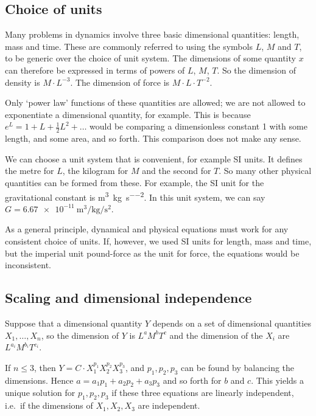 \subsection{Choice of units}
Many problems in dynamics involve three basic dimensional quantities: length, mass and time.
These are commonly referred to using the symbols \(L\), \(M\) and \(T\), to be generic over the choice of unit system.
The dimensions of some quantity \(x\) can therefore be expressed in terms of powers of \(L\), \(M\), \(T\).
So the dimension of density is \(M \cdot L^{-3}\).
The dimension of force is \(M \cdot L \cdot T^{-2}\).

Only `power law' functions of these quantities are allowed; we are not allowed to exponentiate a dimensional quantity, for example.
This is because \(e^L = 1 + L + \frac{1}{2}L^2 + \dots\) would be comparing a dimensionless constant 1 with some length, and some area, and so forth.
This comparison does not make any sense.

We can choose a unit system that is convenient, for example SI units.
It defines the metre for \(L\), the kilogram for \(M\) and the second for \(T\).
So many other physical quantities can be formed from these.
For example, the SI unit for the gravitational constant is \si{\metre\cubed\per\kilogram\per\second\squared}.
In this unit system, we can say \(G = \SI{6.67e-11}{\metre\cubed\per\kilogram\per\second\squared}\).

As a general principle, dynamical and physical equations must work for any consistent choice of units.
If, however, we used SI units for length, mass and time, but the imperial unit pound-force as the unit for force, the equations would be inconsistent.

\subsection{Scaling and dimensional independence}
Suppose that a dimensional quantity \(Y\) depends on a set of dimensional quantities \(X_1, \dots, X_n\), so the dimension of \(Y\) is \(L^a M^b T^c\) and the dimension of the \(X_i\) are \(L^{a_i} M^{b_i} T^{c_i}\).

If \(n \leq 3\), then \(Y = C \cdot X_1^{p_1}X_2^{p_2}X_3^{p_3}\), and \(p_1, p_2, p_3\) can be found by balancing the dimensions.
Hence \(a = a_1p_1 + a_2p_2 + a_3p_3\) and so forth for \(b\) and \(c\).
This yields a unique solution for \(p_1, p_2, p_3\) if these three equations are linearly independent, i.e.\ if the dimensions of \(X_1, X_2, X_3\) are independent.

